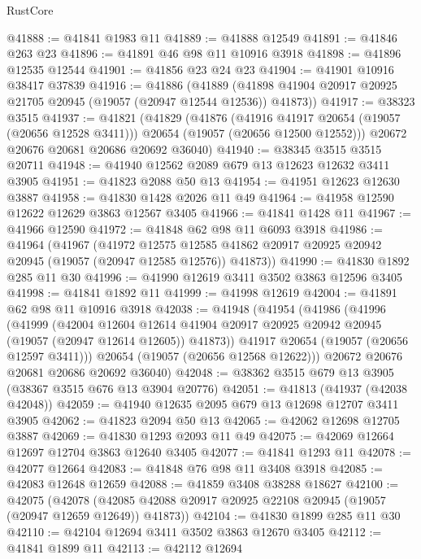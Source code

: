 \begin{lexlean}{RustCore}
\begin{coremodule}
@41888 := @41841 @1983 @11
@41889 := @41888 @12549
@41891 := @41846 @263 @23
@41896 := @41891 @46 @98 @11 @10916 @3918
@41898 := @41896 @12535 @12544
@41901 := @41856 @23 @24 @23
@41904 := @41901 @10916 @38417 @37839
@41916 := @41886
    (@41889 (@41898 @41904 @20917 @20925 @21705 @20945 (@19057 (@20947 @12544 @12536)) @41873))
@41917 := @38323 @3515
@41937 := @41821
    (@41829
      (@41876
        (@41916 @41917 @20654 (@19057 (@20656 @12528 @3411)))
        @20654
        (@19057 (@20656 @12500 @12552)))
      @20672
      @20676
      @20681
      @20686
      @20692
      @36040)
@41940 := @38345 @3515 @3515 @20711
@41948 := @41940 @12562 @2089 @679 @13 @12623 @12632 @3411 @3905
@41951 := @41823 @2088 @50 @13
@41954 := @41951 @12623 @12630 @3887
@41958 := @41830 @1428 @2026 @11 @49
@41964 := @41958 @12590 @12622 @12629 @3863 @12567 @3405
@41966 := @41841 @1428 @11
@41967 := @41966 @12590
@41972 := @41848 @62 @98 @11 @6093 @3918
@41986 := @41964
    (@41967
      (@41972
        @12575
        @12585
        @41862
        @20917
        @20925
        @20942
        @20945
        (@19057 (@20947 @12585 @12576))
        @41873))
@41990 := @41830 @1892 @285 @11 @30
@41996 := @41990 @12619 @3411 @3502 @3863 @12596 @3405
@41998 := @41841 @1892 @11
@41999 := @41998 @12619
@42004 := @41891 @62 @98 @11 @10916 @3918
@42038 := @41948
    (@41954
      (@41986
        (@41996
          (@41999
            (@42004
              @12604
              @12614
              @41904
              @20917
              @20925
              @20942
              @20945
              (@19057 (@20947 @12614 @12605))
              @41873))
          @41917
          @20654
          (@19057 (@20656 @12597 @3411)))
        @20654
        (@19057 (@20656 @12568 @12622)))
      @20672
      @20676
      @20681
      @20686
      @20692
      @36040)
@42048 := @38362 @3515 @679 @13 @3905 (@38367 @3515 @676 @13 @3904 @20776)
@42051 := @41813 (@41937 (@42038 @42048))
@42059 := @41940 @12635 @2095 @679 @13 @12698 @12707 @3411 @3905
@42062 := @41823 @2094 @50 @13
@42065 := @42062 @12698 @12705 @3887
@42069 := @41830 @1293 @2093 @11 @49
@42075 := @42069 @12664 @12697 @12704 @3863 @12640 @3405
@42077 := @41841 @1293 @11
@42078 := @42077 @12664
@42083 := @41848 @76 @98 @11 @3408 @3918
@42085 := @42083 @12648 @12659
@42088 := @41859 @3408 @38288 @18627
@42100 := @42075
    (@42078 (@42085 @42088 @20917 @20925 @22108 @20945 (@19057 (@20947 @12659 @12649)) @41873))
@42104 := @41830 @1899 @285 @11 @30
@42110 := @42104 @12694 @3411 @3502 @3863 @12670 @3405
@42112 := @41841 @1899 @11
@42113 := @42112 @12694

\end{coremodule}
\end{lexlean}

